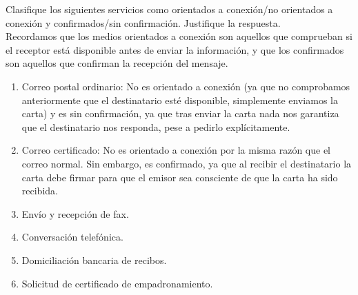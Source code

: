 \begin{ejercicio}
    Clasifique los siguientes servicios como orientados a conexión/no orientados a conexión y confirmados/sin confirmación. Justifique la respuesta.\\

    Recordamos que los medios orientados a conexión son aquellos que comprueban si el receptor está disponible antes de enviar la información, y que los confirmados son aquellos que confirman la recepción del mensaje.
    \begin{enumerate}[label=\alph*.]
        \item Correo postal ordinario: No es orientado a conexión (ya que no comprobamos anteriormente que el destinatario esté disponible, simplemente enviamos la carta) y es sin confirmación, ya que tras enviar la carta nada nos garantiza que el destinatario nos responda, pese a pedirlo explícitamente.
        \item Correo certificado: No es orientado a conexión por la misma razón que el correo normal. Sin embargo, es confirmado, ya que al recibir el destinatario la carta debe firmar para que el emisor sea consciente de que la carta ha sido recibida.
        \item Envío y recepción de fax. %
        \item Conversación telefónica. %
        \item Domiciliación bancaria de recibos. %
        \item Solicitud de certificado de empadronamiento. %
    \end{enumerate}
\end{ejercicio}

